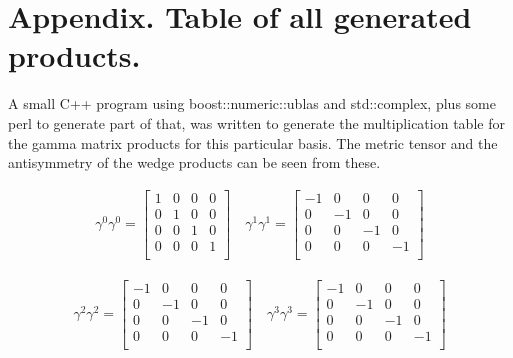 \section{Appendix.  Table of all generated products. }

A small C++ program using boost::numeric::ublas and std::complex,
plus some perl to generate part of that, was
written to generate the multiplication table for the gamma matrix products
for this particular basis.  The metric tensor and the antisymmetry of
the wedge products can be seen from these.





\begin{align*}
\gamma^0 \gamma^0 = \begin{bmatrix}
 1  &  0  &  0  &  0  \\
 0  &  1  &  0  &  0  \\
 0  &  0  &  1  &  0  \\
 0  &  0  &  0  &  1  \\
\end{bmatrix} \quad
\gamma^1 \gamma^1 = \begin{bmatrix}
 -1  &  0  &  0  &  0  \\
 0  &  -1  &  0  &  0  \\
 0  &  0  &  -1  &  0  \\
 0  &  0  &  0  &  -1  \\
\end{bmatrix}
\end{align*}

\begin{align*}
\gamma^2 \gamma^2 = \begin{bmatrix}
 -1  &  0  &  0  &  0  \\
 0  &  -1  &  0  &  0  \\
 0  &  0  &  -1  &  0  \\
 0  &  0  &  0  &  -1  \\
\end{bmatrix} \quad
\gamma^3 \gamma^3 = \begin{bmatrix}
 -1  &  0  &  0  &  0  \\
 0  &  -1  &  0  &  0  \\
 0  &  0  &  -1  &  0  \\
 0  &  0  &  0  &  -1  \\
\end{bmatrix}
\end{align*}

